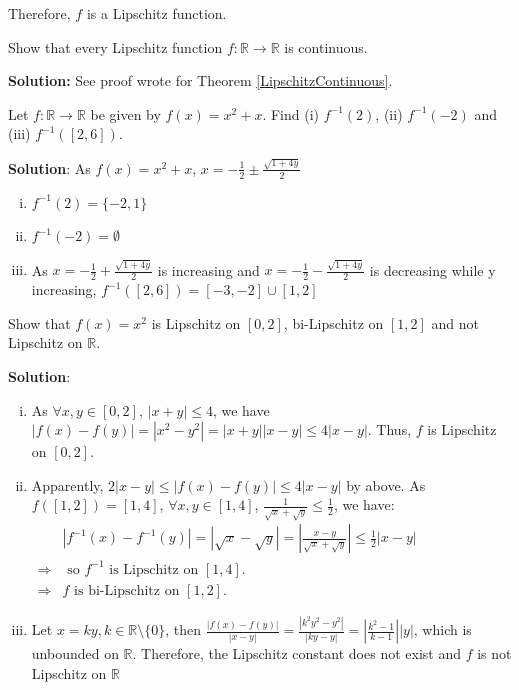 Therefore, $f$ is a Lipschitz function.


\begin{customexercise}{1.14}
    Show that every Lipschitz function 
    $f: \mathbb{R} \rightarrow \mathbb{R}$ is continuous.
\end{customexercise}

\textbf{Solution: } See proof wrote for Theorem \ref{LipschitzContinuous}.


\begin{customexercise}{1.15}
    Let $f: \mathbb{R} \rightarrow \mathbb{R}$ be given by $f(x)=x^{2}+x .$ 
    Find (i) $f^{-1}(2)$, (ii) $f^{-1}(-2)$ and (iii) $f^{-1}([2,6])$.
\end{customexercise}

\textbf{Solution}: As $f(x) = x^2 + x$, $\displaystyle x = -\frac{1}{2} \pm \frac{\sqrt{1 + 4y}}{2}$
\begin{enumerate}[(i)]
    \item $f^{-1}(2) = \{-2, 1\}$
    \item $f^{-1}(-2) = \emptyset$
    \item As $\displaystyle x = -\frac{1}{2} + \frac{\sqrt{1 + 4y}}{2}$ is increasing and $\displaystyle x = -\frac{1}{2} - \frac{\sqrt{1 + 4y}}{2}$ is decreasing while y increasing, 
     $f^{-1}([2,6]) = [-3, -2]\cup [1, 2]$
\end{enumerate}


\begin{customexercise}{1.16}
    Show that $f(x)=x^{2}$ is Lipschitz on $[0,2]$, bi-Lipschitz on 
    $[1,2]$ and not Lipschitz on $\mathbb{R}$.
\end{customexercise}

\textbf{Solution}: 
\begin{enumerate}[(i)]
    \item As $\forall x, y\in [0,2]$, $|x+y|\leq 4$, we have $|f(x)-f(y)|=\left|x^{2}-y^{2}\right|=|x+y||x-y| \leq 4|x-y|$.
    Thus, $f$ is Lipschitz on $[0,2]$.
    \item Apparently, $2|x-y|\leq|f(x) - f(y)|\leq 4|x-y|$ by above. As $f([1, 2]) = [1, 4]$, $\forall x, y \in [1, 4]$, $\displaystyle \frac{1}{\sqrt{x}+\sqrt{y}} \leq \frac{1}{2}$, we have: \\
    \(
    \begin{aligned}
        &\displaystyle \left|f^{-1}(x)-f^{-1}(y)\right|=|\sqrt{x}-\sqrt{y}|=\left|\frac{x-y}{\sqrt{x}+\sqrt{y}}\right| \leq \frac{1}{2}|x-y|\\
        \Rightarrow & \text{ so } f^{-1} \text{ is Lipschitz on } [1,4]. \\
        \Rightarrow & f \text{ is bi-Lipschitz on }[1,2].
    \end{aligned}
    \)
    \item Let $x = ky, k\in\mathbb{R}\setminus\{0\}$, then $\displaystyle \frac{|f(x) - f(y)|}{|x - y|} = \frac{|k^2y^2 - y^2|}{|ky - y|} = \left|\frac{k^2 - 1}{k-1} \right | |y|$, which is unbounded on $\mathbb{R}$. Therefore, the Lipschitz constant does not exist and $f$ is not Lipschitz on $\mathbb{R}$

\end{enumerate}


\newpage
